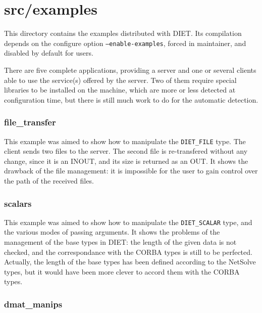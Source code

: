         \section{\textsf{src/examples}}
        \label{s:examples}

        This directory contains the examples distributed with DIET. Its compilation
        depends on the configure option \texttt{--enable-examples}, forced in
        maintainer, and disabled by default for users.

        There are five complete applications, providing a server and one or several
        clients able to use the service(s) offered by the server. Two of them require
        special libraries to be installed on the machine, which are more or less
        detected at configuration time, but there is still much work to do for
        the automatic detection.

        \subsubsection{file\_transfer}

        This example was aimed to show how to manipulate the \texttt{DIET\_FILE} type.
        The client sends two files to the server. The second file is re-transfered
        without any change, since it is an INOUT, and its size is returned as an OUT.
        It shows the drawback of the file management: it is impossible for the user to
        gain control over the path of the received files.

        \subsubsection{scalars}

        This example was aimed to show how to manipulate the \texttt{DIET\_SCALAR} type,
        and the various modes of passing arguments. It shows the problems of the
        management of the base types in DIET: the length of the given data is not
        checked, and the correspondance with the CORBA types is still to be perfected.
        Actually, the length of the base types has been defined according to the
        NetSolve types, but it would have been more clever to accord them with the CORBA
        types. 

        \subsubsection{dmat\_manips}


